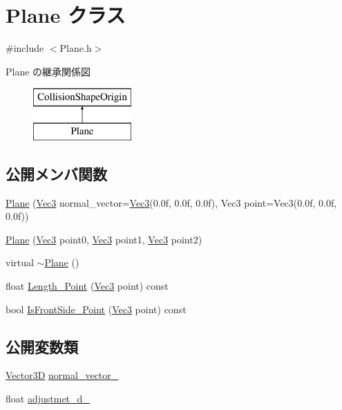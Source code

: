 \hypertarget{class_plane}{}\section{Plane クラス}
\label{class_plane}


{\ttfamily \#include $<$Plane.\+h$>$}

Plane の継承関係図\begin{figure}[H]
\begin{center}
\leavevmode
\includegraphics[height=2.000000cm]{class_plane}
\end{center}
\end{figure}
\subsection*{公開メンバ関数}
\begin{DoxyCompactItemize}
\item 
\mbox{\hyperlink{class_plane_a026c307dff6ed919b337f1ed7e579798}{Plane}} (\mbox{\hyperlink{_vector3_d_8h_ab16f59e4393f29a01ec8b9bbbabbe65d}{Vec3}} normal\+\_\+vector=\mbox{\hyperlink{_vector3_d_8h_ab16f59e4393f29a01ec8b9bbbabbe65d}{Vec3}}(0.\+0f, 0.\+0f, 0.\+0f), Vec3 point=\+Vec3(0.\+0f, 0.\+0f, 0.\+0f))
\item 
\mbox{\hyperlink{class_plane_a9554deff9f83d09a772c15bca3d468d5}{Plane}} (\mbox{\hyperlink{_vector3_d_8h_ab16f59e4393f29a01ec8b9bbbabbe65d}{Vec3}} point0, \mbox{\hyperlink{_vector3_d_8h_ab16f59e4393f29a01ec8b9bbbabbe65d}{Vec3}} point1, \mbox{\hyperlink{_vector3_d_8h_ab16f59e4393f29a01ec8b9bbbabbe65d}{Vec3}} point2)
\item 
virtual \mbox{\hyperlink{class_plane_a69abd86051c880dcb44b249ad10c4436}{$\sim$\+Plane}} ()
\item 
float \mbox{\hyperlink{class_plane_af0315d2a7aebf6057410799f127b6c17}{Length\+\_\+\+Point}} (\mbox{\hyperlink{_vector3_d_8h_ab16f59e4393f29a01ec8b9bbbabbe65d}{Vec3}} point) const
\item 
bool \mbox{\hyperlink{class_plane_afb752b43ee18e5e99f2682595d35fd87}{Is\+Front\+Side\+\_\+\+Point}} (\mbox{\hyperlink{_vector3_d_8h_ab16f59e4393f29a01ec8b9bbbabbe65d}{Vec3}} point) const
\end{DoxyCompactItemize}
\subsection*{公開変数類}
\begin{DoxyCompactItemize}
\item 
\mbox{\hyperlink{class_vector3_d}{Vector3D}} \mbox{\hyperlink{class_plane_abdf97ffa29f452b0faaae0b7d06f4ee5}{normal\+\_\+vector\+\_\+}}
\item 
float \mbox{\hyperlink{class_plane_ab43e3263bd879ea710936d85cacb6006}{adjustmet\+\_\+d\+\_\+}}
\end{DoxyCompactItemize}
